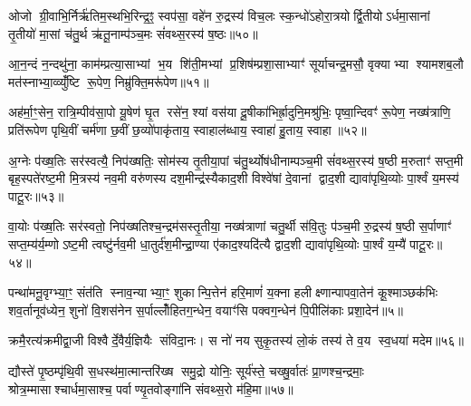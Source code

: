 ओजो ग्री॒वाभि॒र्निर्\mbox{}ऋ॑तिम॒स्थभि॒रिन्द्र॒ꣵ॒ स्वप॑सा॒ वहे॑न रु॒द्रस्य॑ विच॒लः स्क॒न्धो॑ऽहोरा॒त्रयोर्द्वि॒तीयोऽर्धमा॒सानां तृ॒तीयो॑ मा॒सां च॑तु॒र्थ ऋ॑तू॒नाम्प॑ञ्च॒मः सं॑वथ्स॒रस्य॑ ष॒ष्ठः॥५०॥

{\anuvakamend[{ओजो॑ विश॒तिः॥18॥}]}

आ॒न॒न्दं न॒न्दथु॑ना॒ काम॑म्प्रत्या॒साभ्यां भ॒य शि॑ती॒मभ्यां प्र॒शिष॑म्प्रशा॒साभ्याꣳ॑ सूर्याचन्द्र॒मसौ॒ वृक्याभ्या श्यामशब॒लौ मत॑स्नाभ्या॒व्व्युँ॑ष्टि रू॒पेण॒ निम्रु॑क्ति॒मरू॑पेण॥५१॥

{\anuvakamend[{आ॒न॒न्द षोड॑श॥19॥}]}

अह॑र्मा॒ꣳ॒सेन॒ रात्रि॒म्पीव॑सा॒पो यू॒षेण॑ घृ॒त रसे॑न॒ श्यां वस॑या दू॒षीका॑भिर्\mbox{}ह्रा॒दुनि॒मश्रु॑भिः॒ पृष्वा॒न्दिवꣳ॑ रू॒पेण॒ नख्ष॑त्राणि॒ प्रति॑रूपेण पृथि॒वीं चर्म॑णा छ॒वीं छ॒व्यो॑पाकृ॑ताय॒ स्वाहाल॑ब्धाय॒ स्वाहा॑ हु॒ताय॒ स्वाहा॥५२॥

{\anuvakamend[{अह॑र॒ष्टाविꣳ॑शतिः॥20॥}]}

अ॒ग्नेः प॑ख्ष॒तिः सर॑स्वत्यै॒ निप॑ख्षतिः॒ सोम॑स्य तृ॒तीया॒पां च॑तु॒र्थ्योष॑धीनाम्पञ्च॒मी सं॑वथ्स॒रस्य॑ ष॒ष्ठी म॒रुताꣳ॑ सप्त॒मी बृह॒स्पते॑रष्ट॒मी मि॒त्रस्य॑ नव॒मी वरु॑णस्य दश॒मीन्द्र॑स्यैकाद॒शी विश्वे॑षां दे॒वानां द्वाद॒शी द्यावा॑पृथि॒व्योः पा॒र्श्वं य॒मस्य॑ पाटू॒रः॥५३॥

{\anuvakamend[{अ॒ग्नेरेका॒न्नत्रि॒ꣳ॒शत्॥21॥}]}

वा॒योः प॑ख्ष॒तिः सर॑स्वतो॒ निप॑ख्षतिश्च॒न्द्रम॑सस्तृ॒तीया॒ नख्ष॑त्राणां चतु॒र्थी स॑वि॒तुः प॑ञ्च॒मी रु॒द्रस्य॑ ष॒ष्ठी स॒र्पाणाꣳ॑ सप्त॒म्य॑र्य॒म्णोऽष्ट॒मी त्वष्टु॑र्नव॒मी धा॒तुर्द॑श॒मीन्द्रा॒ण्या ए॑काद॒श्यदि॑त्यै द्वाद॒शी द्यावा॑पृथि॒व्योः पा॒र्श्वं य॒म्यै॑ पाटू॒रः॥५४॥

{\anuvakamend[{वा॒योर॒ष्टाविꣳ॑शतिः॥22॥}]}

पन्था॑मनू॒वृग्भ्या॒ꣳ॒ संत॑ति स्नाव॒न्याभ्या॒ꣳ॒ शुकान्पि॒त्तेन॑ हरि॒माणं॑ य॒क्ना हलीक्ष्णान्पापवा॒तेन॑ कू॒श्माञ्छक॑भिः शव॒र्तानूव॑ध्येन॒ शुनो॑ वि॒शस॑नेन स॒र्पाल्लोँ॑हितग॒न्धेन॒ वयाꣳ॑सि पक्वग॒न्धेन॑ पि॒पीलि॑काः प्रशा॒देन॑॥५॥

{\anuvakamend[{पन्था॒न्द्वाविꣳ॑शतिः॥23॥}]}

क्रमै॒रत्य॑क्रमीद्वा॒जी विश्वैर्दे॒वैर्य॒ज्ञियैः संविदा॒नः। स नो॑ नय सुकृ॒तस्य॑ लो॒कं तस्य॑ ते व॒य स्व॒धया॑ मदेम॥५६॥

{\anuvakamend[{क्रमै॑र॒ष्टाद॑श॥24॥}]}

द्यौस्ते॑ पृ॒ष्ठम्पृ॑थि॒वी स॒धस्थ॑मा॒त्मान्तरि॑ख्ष समु॒द्रो योनिः॒ सूर्य॑स्ते॒ चख्षु॒र्वातः॑ प्रा॒णश्च॒न्द्रमाः॒ श्रोत्र॒म्मासाश्चार्धमा॒साश्च॒ पर्वाण्यृ॒तवोङ्गा॑नि संवथ्स॒रो म॑हि॒मा॥५७॥

